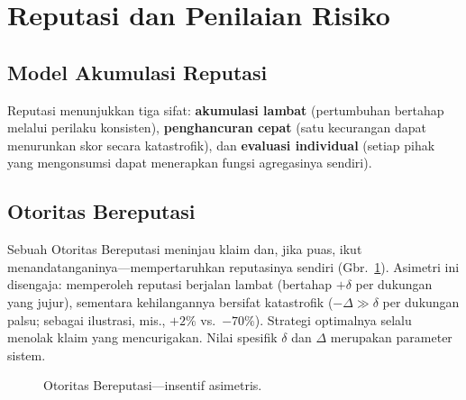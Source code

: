 \documentclass[11pt,a4paper,twocolumn]{article}
\begin{document}
\section{Reputasi dan Penilaian Risiko}

\subsection{Model Akumulasi Reputasi}

Reputasi menunjukkan tiga sifat: \textbf{akumulasi lambat} (pertumbuhan bertahap melalui perilaku konsisten), \textbf{penghancuran cepat} (satu kecurangan dapat menurunkan skor secara katastrofik), dan \textbf{evaluasi individual} (setiap pihak yang mengonsumsi dapat menerapkan fungsi agregasinya sendiri).

\subsection{Otoritas Bereputasi}

Sebuah Otoritas Bereputasi meninjau klaim dan, jika puas, ikut menandatanganinya---mempertaruhkan reputasinya sendiri (Gbr.~\ref{fig:authority}). Asimetri ini disengaja: memperoleh reputasi berjalan lambat (bertahap $+\delta$ per dukungan yang jujur), sementara kehilangannya bersifat katastrofik ($-\Delta \gg \delta$ per dukungan palsu; sebagai ilustrasi, mis., $+2\%$ vs.\ $-70\%$). Strategi optimalnya selalu menolak klaim yang mencurigakan. Nilai spesifik $\delta$ dan $\Delta$ merupakan parameter sistem.

\begin{figure}[ht]
\centering
{}
\caption{Otoritas Bereputasi---insentif asimetris.}
\label{fig:authority}
\end{figure}
\end{document}

